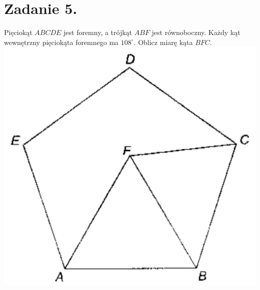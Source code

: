 \documentclass[10pt]{article}
\begin{document}
\section*{Zadanie 5.}
Pięciokąt \(A B C D E\) jest foremny, a trójkąt \(A B F\) jest równoboczny. Każdy kąt wewnętrzny pięciokąta foremnego ma \(108^{\circ}\). Oblicz miarę kąta \(B F C\).\\
\includegraphics[max width=\textwidth, center]{2024_11_21_463a1300a95b8e89e62eg-1}
\end{document}
